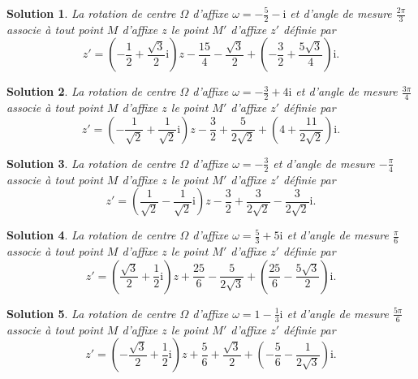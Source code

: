 \documentclass[a4paper]{article}
\newtheorem{solution}{Solution}
\begin{document}
\begin{solution}
La rotation de centre $\Omega$ d'affixe $\omega=-\frac{5}{2}-\mathrm{i}$ et d'angle de mesure $\frac{2 \pi }{3}$ associe \`a tout point $M$ d'affixe $z$ le point $M'$ d'affixe $z'$ d\'efinie par $$z'=\left(-\frac{1}{2}+\frac{\sqrt{3}}{2}\mathrm{i}\right)z-\frac{15}{4}-\frac{\sqrt{3}}{2}+\left(-\frac{3}{2}+\frac{5 \sqrt{3}}{4}\right)\mathrm{i}.$$
\end{solution}\begin{solution}
La rotation de centre $\Omega$ d'affixe $\omega=-\frac{3}{2}+4\mathrm{i}$ et d'angle de mesure $\frac{3 \pi }{4}$ associe \`a tout point $M$ d'affixe $z$ le point $M'$ d'affixe $z'$ d\'efinie par $$z'=\left(-\frac{1}{\sqrt{2}}+\frac{1}{\sqrt{2}}\mathrm{i}\right)z-\frac{3}{2}+\frac{5}{2 \sqrt{2}}+\left(4+\frac{11}{2 \sqrt{2}}\right)\mathrm{i}.$$
\end{solution}\begin{solution}
La rotation de centre $\Omega$ d'affixe $\omega=-\frac{3}{2}$ et d'angle de mesure $-\frac{\pi }{4}$ associe \`a tout point $M$ d'affixe $z$ le point $M'$ d'affixe $z'$ d\'efinie par $$z'=\left(\frac{1}{\sqrt{2}}-\frac{1}{\sqrt{2}}\mathrm{i}\right)z-\frac{3}{2}+\frac{3}{2 \sqrt{2}}-\frac{3}{2 \sqrt{2}}\mathrm{i}.$$
\end{solution}\begin{solution}
La rotation de centre $\Omega$ d'affixe $\omega=\frac{5}{3}+5\mathrm{i}$ et d'angle de mesure $\frac{\pi }{6}$ associe \`a tout point $M$ d'affixe $z$ le point $M'$ d'affixe $z'$ d\'efinie par $$z'=\left(\frac{\sqrt{3}}{2}+\frac{1}{2}\mathrm{i}\right)z+\frac{25}{6}-\frac{5}{2 \sqrt{3}}+\left(\frac{25}{6}-\frac{5 \sqrt{3}}{2}\right)\mathrm{i}.$$
\end{solution}\begin{solution}
La rotation de centre $\Omega$ d'affixe $\omega=1-\frac{1}{3}\mathrm{i}$ et d'angle de mesure $\frac{5 \pi }{6}$ associe \`a tout point $M$ d'affixe $z$ le point $M'$ d'affixe $z'$ d\'efinie par $$z'=\left(-\frac{\sqrt{3}}{2}+\frac{1}{2}\mathrm{i}\right)z+\frac{5}{6}+\frac{\sqrt{3}}{2}+\left(-\frac{5}{6}-\frac{1}{2 \sqrt{3}}\right)\mathrm{i}.$$
\end{solution}
\end{document}

